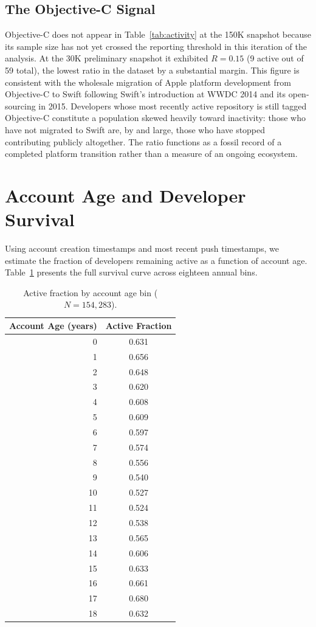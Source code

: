\documentclass[12pt,a4paper]{article}
\begin{document}
\subsection{The Objective-C Signal}

Objective-C does not appear in Table~\ref{tab:activity} at the 150K snapshot
because its sample size has not yet crossed the reporting threshold in this
iteration of the analysis. At the 30K preliminary snapshot it exhibited $R =
0.15$ (9 active out of 59 total), the lowest ratio in the dataset by a
substantial margin. This figure is consistent with the wholesale migration of
Apple platform development from Objective-C to Swift following Swift's
introduction at WWDC 2014 and its open-sourcing in 2015. Developers whose most
recently active repository is still tagged Objective-C constitute a population
skewed heavily toward inactivity: those who have not migrated to Swift are, by
and large, those who have stopped contributing publicly altogether. The ratio
functions as a fossil record of a completed platform transition rather than a
measure of an ongoing ecosystem.

\section{Account Age and Developer Survival}\label{sec:survival}

Using account creation timestamps and most recent push timestamps, we estimate
the fraction of developers remaining active as a function of account age.
Table~\ref{tab:survival} presents the full survival curve across eighteen annual
bins.

\begin{table}[h]
\centering
\begin{tabular}{rc}
\toprule
Account Age (years) & Active Fraction \\
\midrule
 0 & 0.631 \\
 1 & 0.656 \\
 2 & 0.648 \\
 3 & 0.620 \\
 4 & 0.608 \\
 5 & 0.609 \\
 6 & 0.597 \\
 7 & 0.574 \\
 8 & 0.556 \\
 9 & 0.540 \\
10 & 0.527 \\
11 & 0.524 \\
12 & 0.538 \\
13 & 0.565 \\
14 & 0.606 \\
15 & 0.633 \\
16 & 0.661 \\
17 & 0.680 \\
18 & 0.632 \\
\bottomrule
\end{tabular}
\caption{Active fraction by account age bin ($N=154{,}283$).}
\label{tab:survival}
\end{table}
\end{document}

